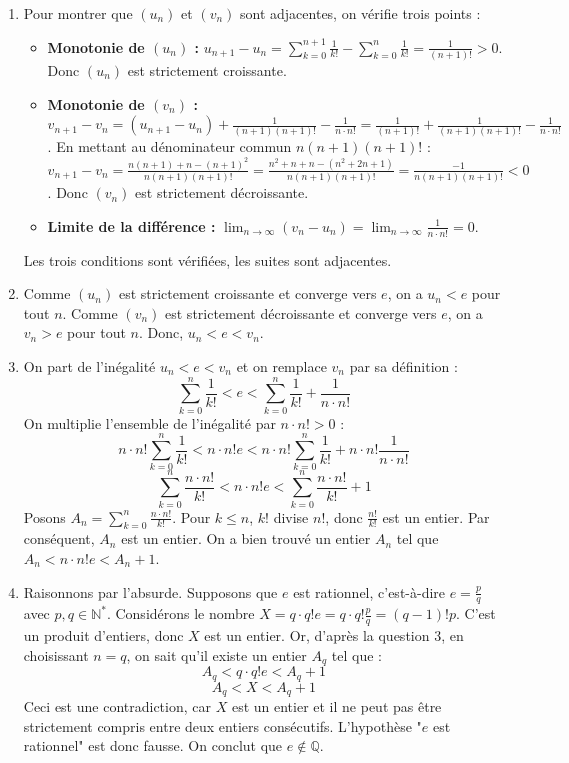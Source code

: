 \documentclass[]{exercices}
\begin{document}
\begin{solution}
	\begin{enumerate}
		\item Pour montrer que $(u_n)$ et $(v_n)$ sont adjacentes, on vérifie trois points :
		      \begin{itemize}
			      \item \textbf{Monotonie de $(u_n)$ :} $u_{n+1}-u_n = \sum_{k=0}^{n+1} \frac{1}{k!} - \sum_{k=0}^{n} \frac{1}{k!} = \frac{1}{(n+1)!} > 0$. Donc $(u_n)$ est strictement croissante.
			      \item \textbf{Monotonie de $(v_n)$ :}
			            $v_{n+1}-v_n = (u_{n+1}-u_n) + \frac{1}{(n+1)(n+1)!} - \frac{1}{n \cdot n!} = \frac{1}{(n+1)!} + \frac{1}{(n+1)(n+1)!} - \frac{1}{n \cdot n!}$.
			            En mettant au dénominateur commun $n(n+1)(n+1)!$ :
			            $v_{n+1}-v_n = \frac{n(n+1) + n - (n+1)^2}{n(n+1)(n+1)!} = \frac{n^2+n+n - (n^2+2n+1)}{n(n+1)(n+1)!} = \frac{-1}{n(n+1)(n+1)!} < 0$.
			            Donc $(v_n)$ est strictement décroissante.
			      \item \textbf{Limite de la différence :} $\lim_{n\to\infty} (v_n - u_n) = \lim_{n\to\infty} \frac{1}{n \cdot n!} = 0$.
		      \end{itemize}
		      Les trois conditions sont vérifiées, les suites sont adjacentes.
		\item Comme $(u_n)$ est strictement croissante et converge vers $e$, on a $u_n < e$ pour tout $n$.
		      Comme $(v_n)$ est strictement décroissante et converge vers $e$, on a $v_n > e$ pour tout $n$.
		      Donc, $u_n < e < v_n$.
		\item On part de l'inégalité $u_n < e < v_n$ et on remplace $v_n$ par sa définition :
		      \[ \sum_{k=0}^{n} \frac{1}{k!} < e < \sum_{k=0}^{n} \frac{1}{k!} + \frac{1}{n \cdot n!} \]
		      On multiplie l'ensemble de l'inégalité par $n \cdot n! > 0$ :
		      \[ n \cdot n! \sum_{k=0}^{n} \frac{1}{k!} < n \cdot n! e < n \cdot n! \sum_{k=0}^{n} \frac{1}{k!} + n \cdot n! \frac{1}{n \cdot n!} \]
		      \[ \sum_{k=0}^{n} \frac{n \cdot n!}{k!} < n \cdot n! e < \sum_{k=0}^{n} \frac{n \cdot n!}{k!} + 1 \]
		      Posons $A_n = \sum_{k=0}^{n} \frac{n \cdot n!}{k!}$. Pour $k \le n$, $k!$ divise $n!$, donc $\frac{n!}{k!}$ est un entier. Par conséquent, $A_n$ est un entier. On a bien trouvé un entier $A_n$ tel que $A_n < n \cdot n! e < A_n + 1$.
		\item Raisonnons par l'absurde. Supposons que $e$ est rationnel, c'est-à-dire $e = \frac{p}{q}$ avec $p, q \in \mathbb{N}^*$.
		      Considérons le nombre $X = q \cdot q! e = q \cdot q! \frac{p}{q} = (q-1)! p$. C'est un produit d'entiers, donc $X$ est un entier.
		      Or, d'après la question 3, en choisissant $n=q$, on sait qu'il existe un entier $A_q$ tel que :
		      \[ A_q < q \cdot q! e < A_q + 1 \]
		      \[ A_q < X < A_q + 1 \]
		      Ceci est une contradiction, car $X$ est un entier et il ne peut pas être strictement compris entre deux entiers consécutifs.
		      L'hypothèse "$e$ est rationnel" est donc fausse. On conclut que $e \notin \mathbb{Q}$.
	\end{enumerate}
\end{solution}
\end{document}
